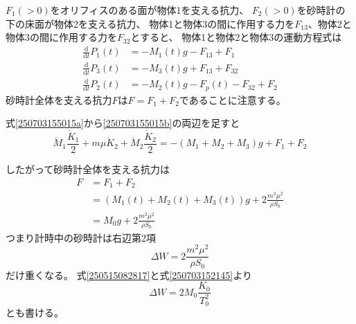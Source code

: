\documentclass[]{article}
\begin{document}



$F_1 (>0)$をオリフィスのある面が物体1を支える抗力、
$F_2 (>0)$を砂時計の下の床面が物体2を支える抗力、
物体1と物体3の間に作用する力を$F_{13}$、物体2と物体3の間に作用する力を$F_{32}$とすると、
物体1と物体2と物体3の運動方程式は
\begin{align}
   \frac{\mathrm{d} }{\mathrm{d} t}  P_1(t) &=   - M_1(t) g - F_{13} + F_1\label{250703155015a}  \\
   \frac{\mathrm{d} }{\mathrm{d} t} P_3(t) &=  - M_3(t) g  + F_{13} + F_{32} \label{2507031550153c} \\
   \frac{\mathrm{d} }{\mathrm{d} t} P_2(t)  &=  - M_2(t) g -F_p(t) - F_{32} + F_2 \label{250703155015b} 
\end{align}
砂時計全体を支える抗力$F$は$F=F_1+F_2$であることに注意する。


式\eqref{250703155015a}から\eqref{250703155015b}の両辺を足すと
\begin{equation} \label{250917103450} 
  \dot{M}_1 \frac{\dot{K}_1}{2}  + m \mu \dot{K}_2 + \dot{M}_2 \frac{\dot{K}_2}{2} =  -(M_1+M_2+M_3) g + F_1 + F_2
\end{equation}


したがって砂時計全体を支える抗力は
\begin{align}
   F &= F_1 + F_2  \label{250703170301a} \\
   &=(M_1(t) + M_2(t)  +M_3(t) )g  +  2\frac{m^2\mu^2}{\rho S_0}   \label{250703170301b} \\
   &=  M_0 g +  2 \frac{m^2\mu^2}{\rho S_0}   \label{250703170301c} 
\end{align}
つまり計時中の砂時計は右辺第2項
\begin{equation} \label{250703173105} 
   \Delta W  = 2 \frac{m^2\mu^2}{\rho S_0}
\end{equation}
だけ重くなる。
式\eqref{250515082817}と式\eqref{250703152145}より
\begin{equation} \label{250703173052} 
    \Delta W  =  2M_0 \frac{K_0}{T_0^2}
\end{equation}
とも書ける。
\end{document}
